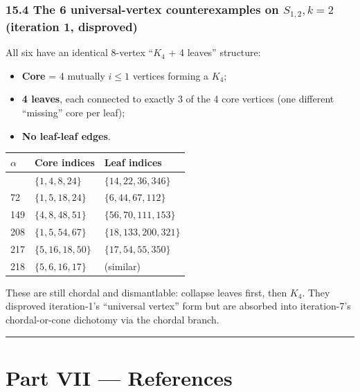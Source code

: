 \documentclass[
]{article}
\newcounter{none} %
\providecommand{\tightlist}{%
  \setlength{\itemsep}{0pt}\setlength{\parskip}{0pt}}
\begin{document}
\subsubsection{\texorpdfstring{15.4 The 6 universal-vertex
counterexamples on \(S_{1,2}, k=2\) (iteration 1,
disproved)}{15.4 The 6 universal-vertex counterexamples on S\_\{1,2\}, k=2 (iteration 1, disproved)}}\label{the-6-universal-vertex-counterexamples-on-s_12-k2-iteration-1-disproved}

All six have an identical 8-vertex ``\(K_4\) + 4 leaves'' structure:

\begin{itemize}
\tightlist
\item
  \textbf{Core} = 4 mutually \(i \le 1\) vertices forming a \(K_4\);
\item
  \textbf{4 leaves}, each connected to exactly 3 of the 4 core vertices
  (one different ``missing'' core per leaf);
\item
  \textbf{No leaf-leaf edges}.
\end{itemize}

{\def\LTcaptype{none} %
\begin{longtable}[]{@{}lll@{}}
\toprule\noalign{}
\(\alpha\) & Core indices & Leaf indices \\
\midrule\noalign{}
\endhead
\bottomrule\noalign{}
\endlastfoot
25 & \(\{1, 4, 8, 24\}\) & \(\{14, 22, 36, 346\}\) \\
72 & \(\{1, 5, 18, 24\}\) & \(\{6, 44, 67, 112\}\) \\
149 & \(\{4, 8, 48, 51\}\) & \(\{56, 70, 111, 153\}\) \\
208 & \(\{1, 5, 54, 67\}\) & \(\{18, 133, 200, 321\}\) \\
217 & \(\{5, 16, 18, 50\}\) & \(\{17, 54, 55, 350\}\) \\
218 & \(\{5, 6, 16, 17\}\) & (similar) \\
\end{longtable}
}

These are still chordal and dismantlable: collapse leaves first, then
\(K_4\). They disproved iteration-1's ``universal vertex'' form but are
absorbed into iteration-7's chordal-or-cone dichotomy via the chordal
branch.

\begin{center}\rule{0.5\linewidth}{0.5pt}\end{center}

\section{Part VII --- References}\label{part-vii-references}
\end{document}
